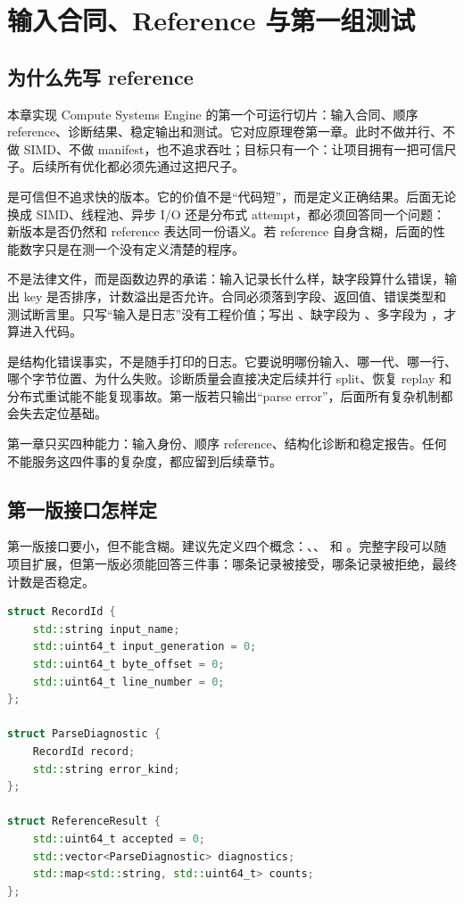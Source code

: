 \chapter{输入合同、Reference 与第一组测试}

\section{为什么先写 reference}

本章实现 Compute Systems Engine 的第一个可运行切片：输入合同、顺序 reference、诊断结果、稳定输出和测试。它对应原理卷第一章。此时不做并行、不做 SIMD、不做 manifest，也不追求吞吐；目标只有一个：让项目拥有一把可信尺子。后续所有优化都必须先通过这把尺子。

 是可信但不追求快的版本。它的价值不是“代码短”，而是定义正确结果。后面无论换成 SIMD、线程池、异步 I/O 还是分布式 attempt，都必须回答同一个问题：新版本是否仍然和 reference 表达同一份语义。若 reference 自身含糊，后面的性能数字只是在测一个没有定义清楚的程序。

 不是法律文件，而是函数边界的承诺：输入记录长什么样，缺字段算什么错误，输出 key 是否排序，计数溢出是否允许。合同必须落到字段、返回值、错误类型和测试断言里。只写“输入是日志”没有工程价值；写出 、缺字段为 、多字段为 ，才算进入代码。

 是结构化错误事实，不是随手打印的日志。它要说明哪份输入、哪一代、哪一行、哪个字节位置、为什么失败。诊断质量会直接决定后续并行 split、恢复 replay 和分布式重试能不能复现事故。第一版若只输出“parse error”，后面所有复杂机制都会失去定位基础。

\begin{keyidea}
第一章只买四种能力：输入身份、顺序 reference、结构化诊断和稳定报告。任何不能服务这四件事的复杂度，都应留到后续章节。
\end{keyidea}

\section{第一版接口怎样定}

第一版接口要小，但不能含糊。建议先定义四个概念：、、 和 。完整字段可以随项目扩展，但第一版必须能回答三件事：哪条记录被接受，哪条记录被拒绝，最终计数是否稳定。

\begin{lstlisting}[language=C++,caption={第一版核心结构}]
struct RecordId {
    std::string input_name;
    std::uint64_t input_generation = 0;
    std::uint64_t byte_offset = 0;
    std::uint64_t line_number = 0;
};

struct ParseDiagnostic {
    RecordId record;
    std::string error_kind;
};

struct ReferenceResult {
    std::uint64_t accepted = 0;
    std::vector<ParseDiagnostic> diagnostics;
    std::map<std::string, std::uint64_t> counts;
};
\end{lstlisting}

